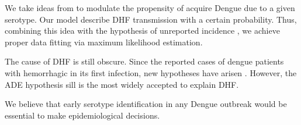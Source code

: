      We take ideas from \citet{Zheng2018, Nuraini2007, Feng1997a} to modulate 
the propensity of acquire Dengue due to a given serotype.  
Our model describe DHF transmission with a certain probability.  
Thus, combining this idea with the hypothesis of unreported 
incidence \cite{Li2013b,Guzman2002}, we achieve proper
data fitting via maximum likelihood estimation. 

The cause of DHF is still obscure. Since the reported cases of dengue patients
with hemorrhagic in its first infection, new hypotheses have arisen 
\cite{Debast1993}.  However, the ADE hypothesis sill is the most widely 
accepted to explain DHF.

We believe that early serotype identification in any Dengue outbreak would be
essential to make epidemiological decisions.
